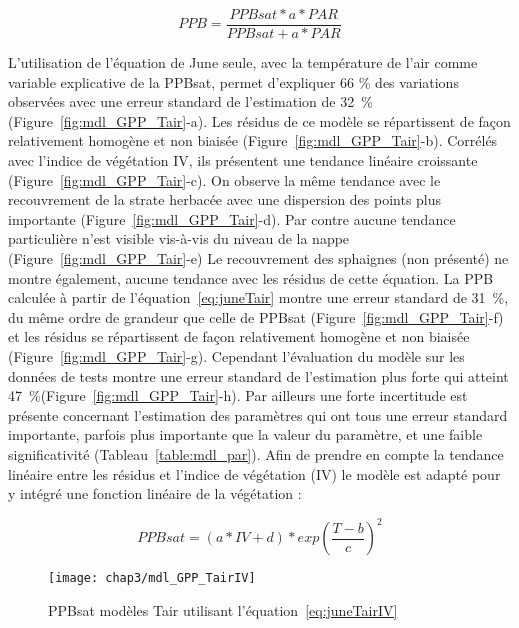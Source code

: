 \begin{equation} \label{eq:PPB_bubier}
PPB = \frac{PPBsat * a * PAR}{PPBsat + a * PAR}
\end{equation}

L'utilisation de l'équation de June seule, avec la température de l'air comme variable explicative de la PPBsat, permet d'expliquer 66 \% des variations observées avec une erreur standard de l'estimation de \SI{32}{\percent} (Figure~\ref{fig:mdl_GPP_Tair}-a).
Les résidus de ce modèle se répartissent de façon relativement homogène et non biaisée (Figure~\ref{fig:mdl_GPP_Tair}-b).
Corrélés avec l'indice de végétation IV, ils présentent une tendance linéaire croissante (Figure~\ref{fig:mdl_GPP_Tair}-c).
On observe la même tendance avec le recouvrement de la strate herbacée avec une dispersion des points plus importante (Figure~\ref{fig:mdl_GPP_Tair}-d).
Par contre aucune tendance particulière n'est visible vis-à-vis du niveau de la nappe (Figure~\ref{fig:mdl_GPP_Tair}-e)
Le recouvrement des sphaignes (non présenté) ne montre également, aucune tendance avec les résidus de cette équation.
La PPB calculée à partir de l'équation~\ref{eq:juneTair} montre une erreur standard de \SI{31}{\percent}, du même ordre de grandeur que celle de PPBsat (Figure~\ref{fig:mdl_GPP_Tair}-f) et les résidus se répartissent de façon relativement homogène et non biaisée (Figure~\ref{fig:mdl_GPP_Tair}-g).
Cependant l'évaluation du modèle sur les données de tests montre une erreur standard de l'estimation plus forte qui atteint \SI{47}{\percent}(Figure~\ref{fig:mdl_GPP_Tair}-h).
Par ailleurs une forte incertitude est présente concernant l'estimation des paramètres qui ont tous une erreur standard importante, parfois plus importante que la valeur du paramètre, et une faible significativité (Tableau~\ref{table:mdl_par}).
Afin de prendre en compte la tendance linéaire entre les résidus et l'indice de végétation (IV) le modèle est adapté pour y intégré une fonction linéaire de la végétation :

\begin{equation}\label{eq:juneTairIV}
PPBsat = (a * IV + d) * exp(\frac{T - b}{c})^2
\end{equation}

\begin{figure}
\centering
\texttt{[image: chap3/mdl\_GPP\_TairIV]}
\caption{PPBsat modèles Tair utilisant l'équation~\ref{eq:juneTairIV}}
\label{fig:mdl_GPP_TairIV}
\end{figure}

